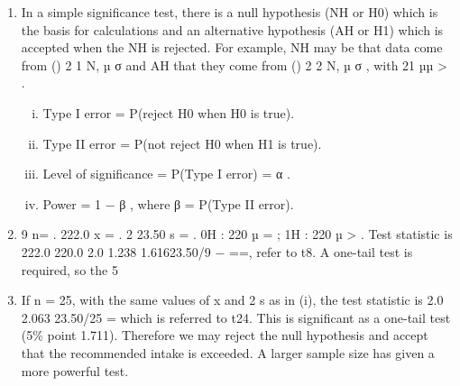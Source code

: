 \documentclass[a4paper,12pt]{article}
\begin{document}
\begin{enumerate} 
\item In a simple significance test, there is a null hypothesis (NH or H0) which is the basis for calculations and an alternative hypothesis (AH or H1) which is accepted when the NH is rejected.  For example, NH may be that data come from () 2 1 N, µ σ
 and AH that they come from () 2 2 N, µ σ , with 21 µµ > . 
 
\begin{enumerate}[(i)] 

\item  Type I error = P(reject H0 when H0 is true). 
\item Type II error = P(not reject H0 when H1 is true). 
\item Level of significance = P(Type I error) = α . 
\item  Power = 1 − β , where β = P(Type II error). 
\end{enumerate} 
 
\item  9 n= .   222.0 x = .   2 23.50 s = .   0H : 220 µ = ;   1H : 220 µ > .  Test statistic is 222.0 220.0 2.0 1.238 1.61623.50/9 − ==, refer to t8. 
 A one-tail test is required, so the 5%
 
\item  If n = 25, with the same values of x and 2 s as in (i), the test statistic is 2.0 2.063 23.50/25 = which is referred to t24.  This is significant as a one-tail test (5\% point 1.711).  Therefore we may reject the null hypothesis and accept that the recommended intake is exceeded.  A larger sample size has given a more powerful test. \end{enumerate}
\end{document}
